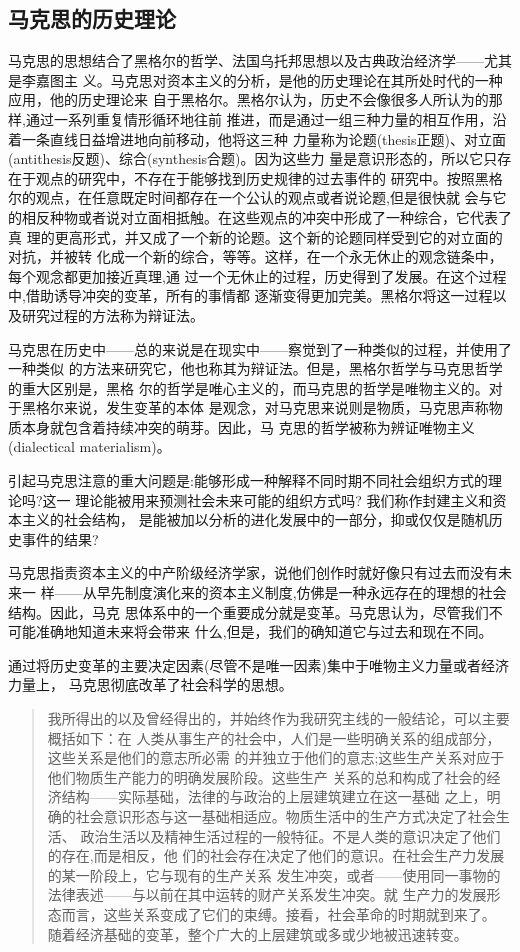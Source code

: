 \subsection{马克思的历史理论}

马克思的思想结合了黑格尔的哲学、法国乌托邦思想以及古典政治经济学——尤其是李嘉图主
义。马克思对资本主义的分析，是他的历史理论在其所处时代的一种应用，他的历史理论来
自于黑格尔。黑格尔认为，历史不会像很多人所认为的那样,通过一系列重复情形循环地往前
推进，而是通过一组三种力量的相互作用，沿着一条直线日益增进地向前移动，他将这三种
力量称为论题(thesis正题)、对立面(antithesis反题)、综合(synthesis合题)。因为这些力
量是意识形态的，所以它只存在于观点的研究中，不存在于能够找到历史规律的过去事件的
研究中。按照黑格尔的观点，在任意既定时间都存在一个公认的观点或者说论题,但是很快就
会与它的相反种物或者说对立面相抵触。在这些观点的冲突中形成了一种综合，它代表了真
理的更高形式，并又成了一个新的论题。这个新的论题同样受到它的对立面的对抗，并被转
化成一个新的综合，等等。这样，在一个永无休止的观念链条中，每个观念都更加接近真理,通
过一个无休止的过程，历史得到了发展。在这个过程中,借助诱导冲突的变革，所有的事情都
逐渐变得更加完美。黑格尔将这一过程以及研究过程的方法称为辩证法。

马克思在历史中——总的来说是在现实中——察觉到了一种类似的过程，并使用了一种类似
的方法来研究它，他也称其为辩证法。但是，黑格尔哲学与马克思哲学的重大区别是，黑格
尔的哲学是唯心主义的，而马克思的哲学是唯物主义的。对于黑格尔来说，发生变革的本体
是观念，对马克思来说则是物质，马克思声称物质本身就包含着持续冲突的萌芽。因此，马
克思的哲学被称为辨证唯物主义(dialectical materialism)。

引起马克思注意的重大问题是:能够形成一种解释不同时期不同社会组织方式的理论吗?这一
理论能被用来预测社会未来可能的组织方式吗? 我们称作封建主义和资本主义的社会结构，
是能被加以分析的进化发展中的一部分，抑或仅仅是随机历史事件的结果?

马克思指责资本主义的中产阶级经济学家，说他们创作时就好像只有过去而没有未来一
样——从早先制度演化来的资本主义制度,仿佛是一种永远存在的理想的社会结构。因此，马克
思体系中的一个重要成分就是变革。马克思认为，尽管我们不可能准确地知道未来将会带来
什么,但是，我们的确知道它与过去和现在不同。

通过将历史变革的主要决定因素(尽管不是唯一因素)集中于唯物主义力量或者经济力量上，
马克思彻底改革了社会科学的思想。

\begin{quotation}
  我所得出的以及曾经得出的，并始终作为我研究主线的一般结论，可以主要概括如下：在
  人类从事生产的社会中，人们是一些明确关系的组成部分，这些关系是他们的意志所必需
  的并独立于他们的意志;这些生产关系对应于他们物质生产能力的明确发展阶段。这些生产
  关系的总和构成了社会的经济结构——实际基础，法律的与政治的上层建筑建立在这一基础
  之上，明确的社会意识形态与这一基础相适应。物质生活中的生产方式决定了社会生活、
  政治生活以及精神生活过程的一般特征。不是人类的意识决定了他们的存在,而是相反，他
  们的社会存在决定了他们的意识。在社会生产力发展的某一阶段上，它与现有的生产关系
  发生冲突，或者——使用同一事物的法律表述——与以前在其中运转的财产关系发生冲突。就
  生产力的发展形态而言，这些关系变成了它们的束缚。接看，社会革命的时期就到来了。
  随着经济基础的变革，整个广大的上层建筑或多或少地被迅速转变。
\end{quotation}

